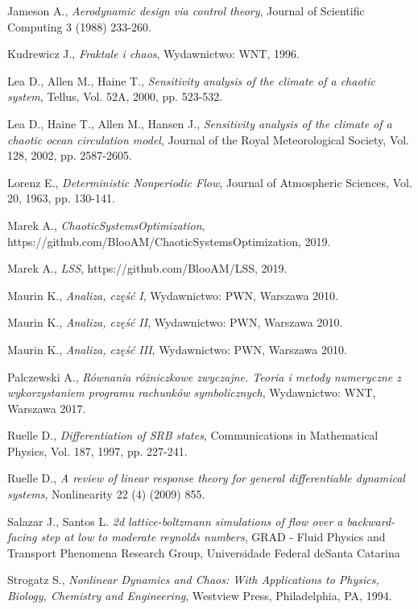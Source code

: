 \documentclass[12pt]{article}
\begin{document}
\begin{thebibliography}{99}
 Jameson A.,
\emph{Aerodynamic design via control theory},
Journal of Scientific Computing 3 (1988) 233-260.

 Kudrewicz J., 
\emph{Fraktale i chaos},
Wydawnictwo: WNT, 1996.

 Lea D., Allen M., Haine T.,
\emph{Sensitivity analysis of the climate of a chaotic system},
Tellus, Vol. 52A, 2000, pp. 523-532.

 Lea D., Haine T., Allen M., Hansen J., 
\emph{Sensitivity analysis of the climate of a chaotic ocean circulation model},
Journal of the Royal Meteorological Society, Vol. 128, 2002, pp. 2587-2605.

 Lorenz E.,
\emph{Deterministic Nonperiodic Flow},
Journal of Atmospheric Sciences, Vol. 20, 1963, pp. 130-141.

 Marek A.,
\emph{ChaoticSystemsOptimization},
https://github.com/BlooAM/ChaoticSystemsOptimization, 2019.

 Marek A.,
\emph{LSS},
https://github.com/BlooAM/LSS, 2019.

 Maurin K.,
\emph{Analiza, część I},
Wydawnictwo: PWN, Warszawa 2010.

 Maurin K.,
\emph{Analiza, część II},
Wydawnictwo: PWN, Warszawa 2010.

 Maurin K.,
\emph{Analiza, część III},
Wydawnictwo: PWN, Warszawa 2010.

 Palczewski A.,
\emph{Równania różniczkowe zwyczajne. Teoria i metody numeryczne z wykorzystaniem programu rachunków symbolicznych},
Wydawnictwo: WNT, Warszawa 2017.

 Ruelle D.,
\emph{Differentiation of SRB states},
Communications in Mathematical Physics, Vol. 187, 1997, pp. 227-241.

 Ruelle D.,
\emph{ A review of linear response theory for general differentiable dynamical systems},
Nonlinearity 22 (4) (2009) 855.

 Salazar J., Santos L.
\emph{2d lattice-boltzmann simulations of flow over a backward-facing step at low to moderate reynolds numbers},
GRAD - Fluid Physics and Transport Phenomena Research Group, Universidade Federal deSanta Catarina
	
 Strogatz S., 
\emph{Nonlinear Dynamics and Chaos: With Applications to Physics, Biology, Chemistry and Engineering},
Westview Press, Philadelphia, PA, 1994.  


\end{thebibliography}
\end{document}
